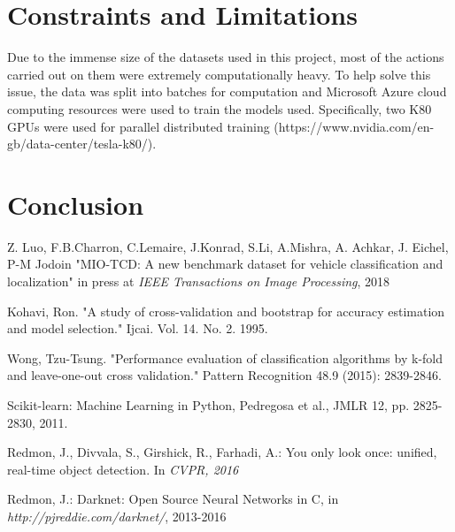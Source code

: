 \documentclass[12pt]{article}
\begin{document}
\section{Constraints and Limitations} 

Due to the immense size of the datasets used in this project, most of the actions carried out on them were extremely computationally heavy. To help solve this issue, the data was split into batches for computation and Microsoft Azure cloud computing resources were used to train the models used. Specifically, two K80 GPUs were used for parallel distributed training (https://www.nvidia.com/en-gb/data-center/tesla-k80/).

\section{Conclusion}

\newpage

\begin{thebibliography}{50}

Z. Luo, F.B.Charron, C.Lemaire, J.Konrad, S.Li, A.Mishra, A. Achkar, J. Eichel, P-M Jodoin "MIO-TCD: A new benchmark dataset for vehicle classification and localization" in press at \textit{IEEE Transactions on Image Processing}, 2018

Kohavi, Ron. "A study of cross-validation and bootstrap for accuracy estimation and model selection." Ijcai. Vol. 14. No. 2. 1995.

Wong, Tzu-Tsung. "Performance evaluation of classification algorithms by k-fold and leave-one-out cross validation." Pattern Recognition 48.9 (2015): 2839-2846.

Scikit-learn: Machine Learning in Python, Pedregosa et al., JMLR 12, pp. 2825-2830, 2011.

Redmon, J., Divvala, S., Girshick, R., Farhadi, A.: You only look once: unified, real-time object detection. In \textit{CVPR, 2016}

Redmon, J.: Darknet: Open Source Neural Networks in C, in \textit{http://pjreddie.com/darknet/}, 2013-2016


\end{thebibliography}

\newpage

\setcounter{section}{0}
\end{document}
